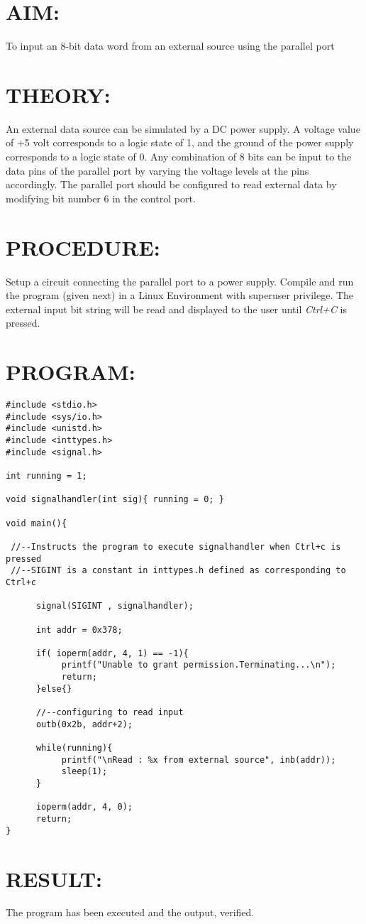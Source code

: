 
%
%
\section*{AIM:}
To input an 8-bit data word from an external source using the parallel port
\section*{THEORY:}
An external data source can be simulated by a DC power supply. A voltage value of +5 volt corresponds to a logic state of 1, and the ground of the power supply corresponds to a logic state of 0. Any combination of 8
bits can be input to the data pins of the parallel port by varying the voltage levels at the pins accordingly. The parallel port should be configured to read external data by modifying bit number 6 in the control port.
\section*{PROCEDURE:}
Setup a circuit connecting the parallel port to a power supply. Compile and run the program (given next) in a Linux Environment with superuser privilege. The external input bit string will be read and displayed to the user until \emph{Ctrl+C} is pressed.
\section*{PROGRAM:}
\begin{lstlisting}
#include <stdio.h>
#include <sys/io.h>
#include <unistd.h>
#include <inttypes.h>
#include <signal.h>

int running = 1;

void signalhandler(int sig){ running = 0; }

void main(){

 //--Instructs the program to execute signalhandler when Ctrl+c is pressed
 //--SIGINT is a constant in inttypes.h defined as corresponding to Ctrl+c
 
      signal(SIGINT , signalhandler);
      
      int addr = 0x378;
      
      if( ioperm(addr, 4, 1) == -1){
           printf("Unable to grant permission.Terminating...\n");
           return;
      }else{}
      
      //--configuring to read input
      outb(0x2b, addr+2);
      
      while(running){
           printf("\nRead : %x from external source", inb(addr));
           sleep(1);
      }
      
      ioperm(addr, 4, 0);
      return;
}
\end{lstlisting}

\section*{RESULT:}
The program has been executed and the output, verified.
